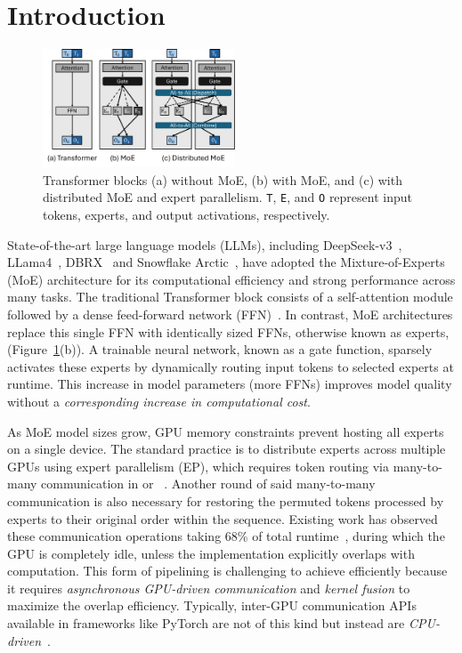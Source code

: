 \section{Introduction}\label{sec:introduction}

\begin{figure}
    \centering
    \includegraphics[width=0.51\textwidth, keepaspectratio]{figures/fig-bg-moe}
    \caption{Transformer blocks (a) without MoE, (b) with MoE, and (c) with distributed MoE and expert parallelism.
    \texttt{T}, \texttt{E}, and \texttt{O} represent input tokens, experts, and output activations, respectively.}
    \label{fig:bg:moe}
    \vspace{-10pt}
\end{figure}
State-of-the-art large language models (LLMs), including DeepSeek-v3~\cite{deepep}, LLama4~\cite{llama4},
DBRX~\cite{dbrx} and Snowflake Arctic~\cite{arctic},
have adopted the Mixture-of-Experts (MoE) architecture for its
computational efficiency and strong performance across many tasks.
The traditional Transformer block consists of a self-attention module followed by a
dense feed-forward network (FFN)~\cite{NIPS2017_3f5ee243}.
In contrast, MoE architectures replace this single FFN with identically sized FFNs,
otherwise known as experts, (Figure~\ref{fig:bg:moe}(b)).
A trainable neural network, known as a gate function, sparsely activates these experts by
dynamically routing input tokens to selected experts at runtime.
This increase in model parameters (more FFNs) improves model quality without a
\textit{corresponding increase in computational cost}.

As MoE model sizes grow, GPU memory constraints prevent hosting all experts on a single device.
The standard practice is to distribute experts across multiple GPUs using expert parallelism (EP),
which requires token routing via many-to-many communication in \alltoall or \allgather~\cite{deepep, arctic, dbrx, 10.1145/3577193.3593704}.
Another round of said many-to-many communication is also necessary for restoring the permuted tokens processed by experts
to their original order within the sequence.
Existing work has observed these communication operations
taking 68\% of total runtime~\cite{10.1145/3603269.3604869, MLSYS2024_339caf45},
during which the GPU is completely idle, unless the implementation explicitly overlaps with computation.
This form of pipelining is challenging to achieve efficiently because it requires
\emph{asynchronous GPU-driven communication} and \emph{kernel fusion} to maximize the overlap efficiency.
Typically, inter-GPU communication APIs available in frameworks like PyTorch are not of this kind but instead are
\emph{CPU-driven}~\cite{nccl}.

